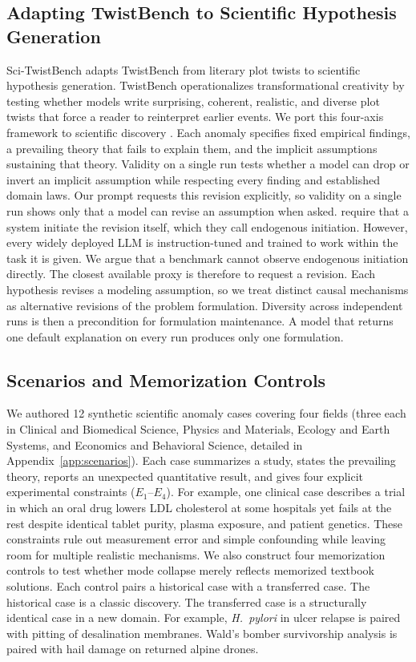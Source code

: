 \documentclass{article}
\begin{document}
\subsection{Adapting TwistBench to Scientific Hypothesis Generation}

Sci-TwistBench adapts TwistBench \citep{schapiro2026twistbench} from literary plot twists to scientific hypothesis generation. TwistBench operationalizes transformational creativity \citep{boden2004creative} by testing whether models write surprising, coherent, realistic, and diverse plot twists that force a reader to reinterpret earlier events. We port this four-axis framework to scientific discovery \citep{vanderschaar2026creativity}. Each anomaly specifies fixed empirical findings, a prevailing theory that fails to explain them, and the implicit assumptions sustaining that theory. Validity on a single run tests whether a model can drop or invert an implicit assumption while respecting every finding and established domain laws. Our prompt requests this revision explicitly, so validity on a single run shows only that a model can revise an assumption when asked. \citet{vanderschaar2026creativity} require that a system initiate the revision itself, which they call endogenous initiation. However, every widely deployed LLM is instruction-tuned and trained to work within the task it is given. We argue that a benchmark cannot observe endogenous initiation directly. The closest available proxy is therefore to request a revision. Each hypothesis revises a modeling assumption, so we treat distinct causal mechanisms as alternative revisions of the problem formulation. Diversity across independent runs is then a precondition for formulation maintenance. A model that returns one default explanation on every run produces only one formulation.

\subsection{Scenarios and Memorization Controls}

We authored 12 synthetic scientific anomaly cases covering four fields (three each in Clinical and Biomedical Science, Physics and Materials, Ecology and Earth Systems, and Economics and Behavioral Science, detailed in Appendix~\ref{app:scenarios}). Each case summarizes a study, states the prevailing theory, reports an unexpected quantitative result, and gives four explicit experimental constraints ($E_1$--$E_4$). For example, one clinical case describes a trial in which an oral drug lowers LDL cholesterol at some hospitals yet fails at the rest despite identical tablet purity, plasma exposure, and patient genetics. These constraints rule out measurement error and simple confounding while leaving room for multiple realistic mechanisms. We also construct four memorization controls to test whether mode collapse merely reflects memorized textbook solutions. Each control pairs a historical case with a transferred case. The historical case is a classic discovery. The transferred case is a structurally identical case in a new domain. For example, \textit{H.\ pylori} in ulcer relapse is paired with pitting of desalination membranes. Wald's bomber survivorship analysis is paired with hail damage on returned alpine drones.
\end{document}

